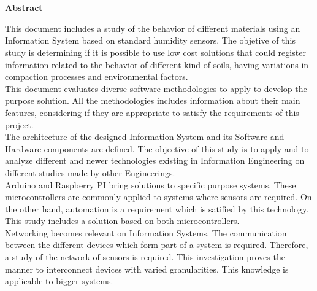 

\newpage


\chapter*{}
\begin{center}
\textbf{Abstract}
\end{center}

This document includes a study of the behavior of different materials using an Information System based on standard humidity sensors. The objetive of this study is determining if it is possible to use low cost solutions that could register information related to the behavior of different kind of soils, having variations in compaction processes and environmental factors.\\

This document evaluates diverse software methodologies to apply to develop the purpose solution. All the methodologies includes information about their main features, considering if they are appropriate to satisfy the requirements of this project.\\

The architecture of the designed Information System and its Software and Hardware components are defined. The objective of this study is to apply and to analyze different and newer technologies existing in Information Engineering on different studies made by other Engineerings.\\

Arduino and Raspberry PI bring solutions to specific purpose systems. These microcontrollers are commonly applied to systems where sensors are required. On the other hand, automation is a requirement which is satified by this technology. This study includes a solution based on both microcontrollers.\\

Networking becomes relevant on Information Systems. The communication between the different devices which form part of a system is required. Therefore, a study of the network of sensors is required. This investigation proves the manner to interconnect devices with varied granularities. This knowledge is applicable to bigger systems.\\

